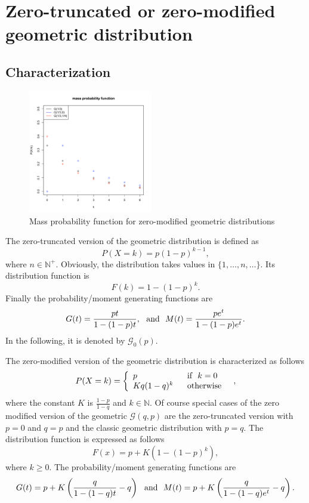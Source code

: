 \section{Zero-truncated or zero-modified geometric distribution}
\subsection{Characterization}
\begin{figure}
  \vspace{-30pt}
  \begin{center}
    \includegraphics[width=0.48\textwidth]{img/truncgeomzoom}
  \end{center}
  \caption{Mass probability function for zero-modified geometric distributions}
\end{figure}

The zero-truncated version of the geometric distribution is defined as
$$
P(X=k) = p(1-p)^{k-1},
$$
where $n\in\mathbb N^+$. Obviously, the distribution takes values in $\{1,\dots, n,\dots\}$.
Its distribution function is 
$$
F(k) = 1-(1-p)^k.
$$
Finally the probability/moment generating functions are
$$
G(t) = \frac{pt}{1-(1-p)t}, \textrm{~~and~~} M(t) = \frac{pe^t}{1-(1-p)e^t}.
$$
In the following, it is denoted by $\mathcal G_0(p)$.

The zero-modified version of the geometric distribution is characterized as follows
$$
P(X=k) = \left\{
\begin{array}{ll}
p & \textrm{~~if~~} k=0\\
Kq(1-q)^k & \textrm{~~otherwise~~}\\
\end{array}
\right. ,
$$
where the constant $K$ is $\frac{1-p}{1-q}$ and $k\in\mathbb N$.
Of course special cases of the zero modified version of the geometric $\mathcal G(q,p)$ are the zero-truncated version with $p=0$ and $q=p$ and the classic geometric distribution with $p=q$. The distribution function is expressed as follows
$$
F(x) = p+K(1-(1-p)^k),
$$
where $k\geq 0$. The probability/moment generating functions are 
$$
G(t) = p+K\left(\frac{q}{1-(1-q)t}-q\right) \textrm{~~and~~} M(t) =p+K\left(\frac{q}{1-(1-q)e^{t}}-q\right).
 $$

